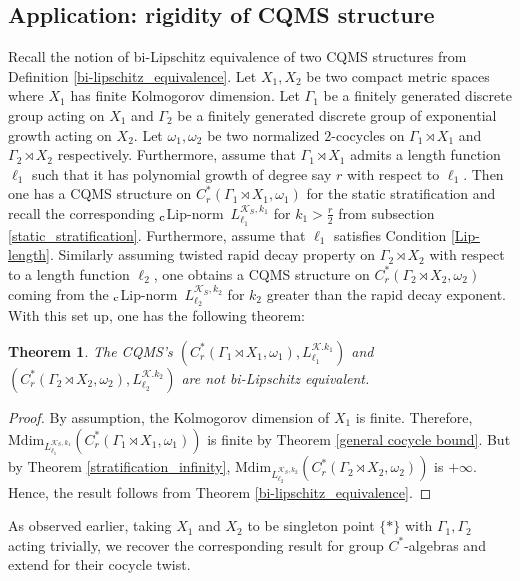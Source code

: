 \documentclass[a4paper,11pt,reqno]{amsart}
\theoremstyle{plain}
\newtheorem{thm}{Theorem}[section]
\theoremstyle{mainthmstyle}
\theoremstyle{named}
\numberwithin{equation}{section}
\newcommand{\clipnorm}{$_{\text{\rm c}}$Lip-norm}
\begin{document}
\subsection{Application: rigidity of CQMS structure} Recall the notion of bi-Lipschitz equivalence of two CQMS structures from Definition \ref{bi-lipschitz_equivalence}. Let $X_1,X_2$ be two compact metric spaces where $X_1$ has finite Kolmogorov dimension. Let $\Gamma_{1}$ be a finitely generated discrete group acting on $X_{1}$ and $\Gamma_{2}$ be a finitely generated discrete group of exponential growth acting on $X_{2}$. Let $\omega_{1},\omega_{2}$ be two normalized $2$-cocycles on $\Gamma_1\rtimes X_1$ and $\Gamma_2\rtimes X_{2}$ respectively. Furthermore, assume that $\Gamma_{1}\rtimes X_{1}$ admits a length function $\ell_{1}$ such that it has polynomial growth of degree say $r$ with respect to $\ell_1$. Then one has a CQMS structure on $C^{\ast}_{r}(\Gamma_{1}\rtimes X_{1},\omega_1)$ for the static stratification and recall the corresponding \clipnorm\ $L^{\mathcal{K}_{S},k_1}_{\ell_1}$ for $k_1>\frac{r}{2}$ from subsection \ref{static_stratification}. Furthermore, assume that $\ell_1$ satisfies Condition \ref{Lip-length}. Similarly assuming twisted rapid decay property on $\Gamma_{2}\rtimes X_{2}$ with respect to a length function $\ell_2$, one obtains a CQMS structure on $C^{\ast}_{r}(\Gamma_{2} \rtimes X_{2},\omega_2)$ coming from the \clipnorm\ $L^{\mathcal{K}_{S},k_{2}}_{\ell_2}$ for $k_{2}$ greater than the rapid decay exponent. With this set up, one has the following theorem:
\begin{thm}
    The CQMS's $(C^{\ast}_{r}(\Gamma_{1}\rtimes X_{1},\omega_1), L^{\mathcal{K}.k_1}_{\ell_1})$ and $(C^{\ast}_{r}(\Gamma_{2}\rtimes X_{2},\omega_2),L^{\mathcal{K}.k_2}_{\ell_2})$ are not bi-Lipschitz equivalent.
\end{thm}
\begin{proof}
 By assumption, the Kolmogorov dimension of $X_1$ is finite. Therefore, $\mathrm{Mdim}_{L^{\mathcal{K}_{S},k_1}_{\ell_1}} (C_r^{\ast}(\Gamma_1\rtimes X_{1}, \omega_1))$ is finite  by Theorem \ref{general cocycle bound}. But by Theorem \ref{stratification_infinity}, $\mathrm{Mdim}_{L^{\mathcal{K}_{S},k_2}_{\ell_2}} (C_r^{\ast}(\Gamma_2\rtimes X_{2}, \omega_2))$ is $+\infty$. Hence, the result follows from Theorem \ref{bi-lipschitz_equivalence}.  
\end{proof}
As observed earlier, taking $X_{1}$ and $X_{2}$ to be singleton point $\{\ast\}$ with $\Gamma_{1},\Gamma_2$ acting trivially, we recover the corresponding result for group $C^{\ast}$-algebras and extend for their cocycle twist.
\end{document}
